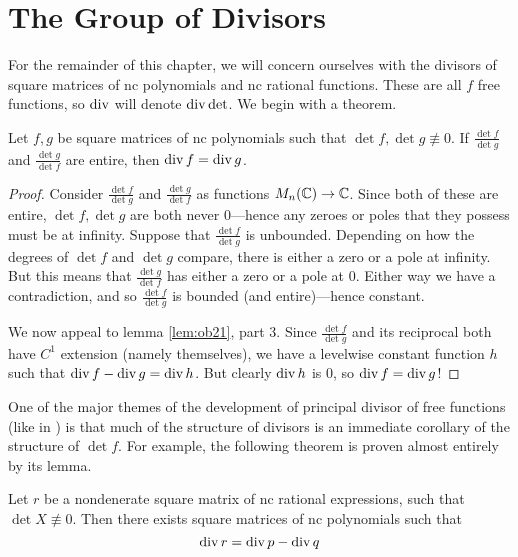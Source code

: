 \section{The Group of Divisors}%
\label{sec:divpoly}

For the remainder of this chapter, we will concern ourselves with the divisors
of square matrices of nc polynomials and nc rational functions. These are all
\(f\) free functions, so \(\operatorname{div}\) will denote \(\operatorname{div} \det\). We begin with a
theorem.

\begin{theorem}
  Let \(f,g\) be square matrices of nc polynomials such that
  \(\det f, \det g \not\equiv 0\). If \(\frac{\det f}{\det g}\) and
  \(\frac{\det g}{\det f}\) are entire, then \(\operatorname{div} f = \operatorname{div} g\).
\end{theorem}

\begin{proof}
  Consider \(\frac{\det f}{\det g}\) and \(\frac{\det g}{\det f}\) as functions
  \(M_n(\mathbb{C})\to \mathbb{C} \). Since both of these are entire, \(\det f, \det g\) are
  both never 0---hence any zeroes or poles that they possess must be at
  infinity. Suppose that \(\frac{\det f}{\det g}\) is unbounded. Depending on how
  the degrees of \(\det f\) and \(\det g\) compare, there is either a zero or a
  pole at infinity. But this means that \(\frac{\det g}{\det f}\) has either a
  zero or a pole at \(0\). Either way we have a contradiction, and so
  \(\frac{\det f}{\det g}\) is bounded (and entire)---hence constant.

  We now appeal to lemma \ref{lem:ob21}, part 3. Since \(\frac{\det f}{\det g}\)
  and its reciprocal both have \(C^1\) extension (namely themselves), we have a
  levelwise constant function \(h\) such that \(\operatorname{div} f - \operatorname{div} g = \operatorname{div} h\).
  But clearly \(\operatorname{div} h\) is 0, so \(\operatorname{div} f = \operatorname{div} g\)!
\end{proof}

One of the major themes of the development of principal divisor of free
functions (like in \cite{pascoeFreeNoncommutativePrincipal2020}) is that much of
the structure of divisors is an immediate corollary of the structure of
\(\det f\). For example, the following theorem is proven almost entirely by its
lemma.

\begin{theorem}%
\label{thm:divop}
  Let \(r\) be a nondenerate square matrix of nc rational expressions, such that
  \(\det X \not\equiv 0 \). Then there exists square matrices of nc polynomials
  such that
  \[
    \operatorname{div} r = \operatorname{div} p - \operatorname{div} q
  \]
\end{theorem}

